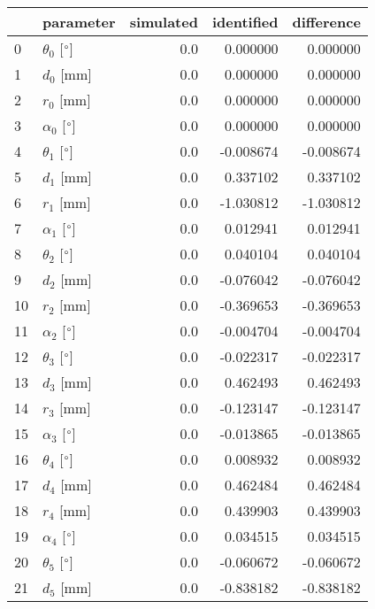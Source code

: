 \documentclass{standalone}%
\begin{document}
%
\normalsize%
\begin{tabular}{llrrr}
\toprule
{} &                 parameter & simulated & identified & difference \\
\midrule
0  &  $\theta_{0}$ [$\degree$] &       0.0 &   0.000000 &   0.000000 \\
1  &              $d_{0}$ [mm] &       0.0 &   0.000000 &   0.000000 \\
2  &              $r_{0}$ [mm] &       0.0 &   0.000000 &   0.000000 \\
3  &  $\alpha_{0}$ [$\degree$] &       0.0 &   0.000000 &   0.000000 \\
4  &  $\theta_{1}$ [$\degree$] &       0.0 &  -0.008674 &  -0.008674 \\
5  &              $d_{1}$ [mm] &       0.0 &   0.337102 &   0.337102 \\
6  &              $r_{1}$ [mm] &       0.0 &  -1.030812 &  -1.030812 \\
7  &  $\alpha_{1}$ [$\degree$] &       0.0 &   0.012941 &   0.012941 \\
8  &  $\theta_{2}$ [$\degree$] &       0.0 &   0.040104 &   0.040104 \\
9  &              $d_{2}$ [mm] &       0.0 &  -0.076042 &  -0.076042 \\
10 &              $r_{2}$ [mm] &       0.0 &  -0.369653 &  -0.369653 \\
11 &  $\alpha_{2}$ [$\degree$] &       0.0 &  -0.004704 &  -0.004704 \\
12 &  $\theta_{3}$ [$\degree$] &       0.0 &  -0.022317 &  -0.022317 \\
13 &              $d_{3}$ [mm] &       0.0 &   0.462493 &   0.462493 \\
14 &              $r_{3}$ [mm] &       0.0 &  -0.123147 &  -0.123147 \\
15 &  $\alpha_{3}$ [$\degree$] &       0.0 &  -0.013865 &  -0.013865 \\
16 &  $\theta_{4}$ [$\degree$] &       0.0 &   0.008932 &   0.008932 \\
17 &              $d_{4}$ [mm] &       0.0 &   0.462484 &   0.462484 \\
18 &              $r_{4}$ [mm] &       0.0 &   0.439903 &   0.439903 \\
19 &  $\alpha_{4}$ [$\degree$] &       0.0 &   0.034515 &   0.034515 \\
20 &  $\theta_{5}$ [$\degree$] &       0.0 &  -0.060672 &  -0.060672 \\
21 &              $d_{5}$ [mm] &       0.0 &  -0.838182 &  -0.838182 \\

\end{tabular}
\end{document}
